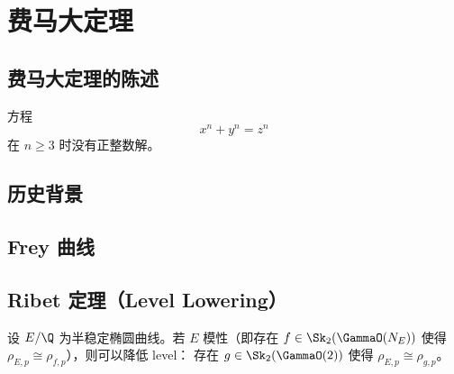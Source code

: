 \chapter{费马大定理}
\label{ch:flt}

\section{费马大定理的陈述}

\begin{theorem}
\label{thm:flt}
方程
\[
  x^n + y^n = z^n
\]
在 $n \geq 3$ 时没有正整数解。
\end{theorem}

\section{历史背景}


\section{Frey 曲线}


\section{Ribet 定理（Level Lowering）}

\begin{theorem}[Ribet, 1990]
设 $E/\Q$ 为半稳定椭圆曲线。若 $E$ 模性（即存在 $f \in \Sk_2(\GammaO(N_E))$
使得 $\rho_{E,p} \cong \rho_{f,p}$），则可以降低 level：
存在 $g \in \Sk_2(\GammaO(2))$ 使得 $\rho_{E,p} \cong \rho_{g,p}$。
\end{theorem}


